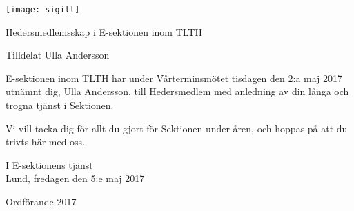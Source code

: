 \documentclass[12pt]{article}
\def\erik{Erik Månsson}
\def\ulla{Ulla Andersson}
\def\docauthor{\erik}
\begin{document}
    \vspace*{2mm}

    \begin{center}
        \texttt{[image: sigill]}\par
        \vspace*{6mm}
        {\Large Hedersmedlemsskap i E-sektionen inom TLTH}\par
        \vspace*{1mm}
        {\Large Tilldelat {\ulla}}\par
    \end{center}

    \vspace*{4mm}

    E-sektionen inom TLTH har under Vårterminsmötet tisdagen den 2:a maj 2017 utnämnt dig, {\ulla}, till Hedersmedlem med anledning av din långa och trogna tjänst i Sektionen.

    Vi vill tacka dig för allt du gjort för Sektionen under åren, och hoppas på att du trivts här med oss.

    \begin{signatures}{1}
        I E-sektionens tjänst \\
        Lund, fredagen den 5:e maj 2017
        \signature{\docauthor}{Ordförande 2017}
    \end{signatures}
\end{document}
